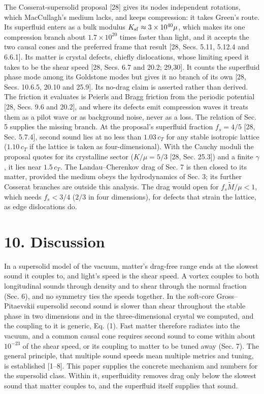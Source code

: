 \documentclass[
  11pt,
]{article}
\begin{document}
The Cosserat-supersolid proposal {[}28{]} gives its nodes independent
rotations, which MacCullagh's medium lacks, and keeps compression: it
takes Green's route. Its superfluid enters as a bulk modulus
\(K_{\rm sf}\approx3\times10^{40}\mu\), which makes its one compression
branch about \(1.7\times10^{20}\) times faster than light, and it
accepts the two causal cones and the preferred frame that result {[}28,
Secs. 5.11, 5.12.4 and 6.6.1{]}. Its matter is crystal defects, chiefly
dislocations, whose limiting speed it takes to be the shear speed {[}28,
Secs. 6.7 and 20.2; 29,30{]}. It counts the superfluid phase mode among
its Goldstone modes but gives it no branch of its own {[}28, Secs.
10.6.5, 20.10 and 25.9{]}. Its no-drag claim is asserted rather than
derived. The friction it evaluates is Peierls and Bragg friction from
the periodic potential {[}28, Secs. 9.6 and 20.2{]}, and where its
defects emit compression waves it treats them as a pilot wave or as
background noise, never as a loss. The relation of Sec. 5 supplies the
missing branch. At the proposal's superfluid fraction \(f_s=4/5\) {[}28,
Sec. 5.7.4{]}, second sound lies at no less than \(1.03\,c_T\) for any
stable isotropic lattice (\(1.10\,c_T\) if the lattice is taken as
four-dimensional). With the Cauchy moduli the proposal quotes for its
crystalline sector (\(K/\mu=5/3\) {[}28, Sec. 25.3{]}) and a finite
\(\gamma\), it lies near \(1.5\,c_T\). The Landau--Cherenkov drag of
Sec. 7 is then closed to its matter, provided the medium obeys the
hydrodynamics of Sec. 3; its further Cosserat branches are outside this
analysis. The drag would open for \(f_s\tilde M/\mu<1\), which needs
\(f_s<3/4\) (\(2/3\) in four dimensions), for defects that strain the
lattice, as edge dislocations do.

\hypertarget{discussion}{%
\section{10. Discussion}\label{discussion}}

In a supersolid model of the vacuum, matter's drag-free range ends at
the slowest sound it couples to, and light's speed is the shear speed. A
vortex couples to both longitudinal sounds through density and to shear
through the normal fraction (Sec. 6), and no symmetry ties the speeds
together. In the soft-core Gross--Pitaevskii supersolid second sound is
slower than shear throughout the stable phase in two dimensions and in
the three-dimensional crystal we computed, and the coupling to it is
generic, Eq. (1). Fast matter therefore radiates into the vacuum, and a
common causal cone requires second sound to come within about
\(10^{-23}\) of the shear speed, or its coupling to matter to be tuned
away (Sec. 7). The general principle, that multiple sound speeds mean
multiple metrics and tuning, is established {[}1--8{]}. This paper
supplies the concrete mechanism and numbers for the supersolid class.
Within it, superfluidity removes drag only below the slowest sound that
matter couples to, and the superfluid itself supplies that sound.
\end{document}

